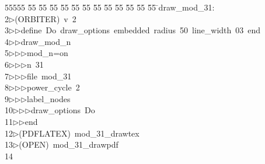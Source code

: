 %
%
\begin{tabbing}
55555 \= 55 \= 55 \= 55 \= 55 \= 55 \= 55 \= 55 \= 55 \= 55 \= 55 \= 55 \= 55 \= \>draw\_mod\_31:\\[0pt]
2\>$\triangleright$\>(ORBITER)\ v\ 2\ \\[0pt]
3\>$\triangleright$\>$\triangleright$\>define\ Do\ draw\_options\ embedded\ radius\ 50\ line\_width\ 03\ end\ \\[0pt]
4\>$\triangleright$\>$\triangleright$\>draw\_mod\_n\ \\[0pt]
5\>$\triangleright$\>$\triangleright$\>$\triangleright$\>mod\_n=on\ \\[0pt]
6\>$\triangleright$\>$\triangleright$\>$\triangleright$\>n\ 31\ \\[0pt]
7\>$\triangleright$\>$\triangleright$\>$\triangleright$\>file\ mod\_31\ \\[0pt]
8\>$\triangleright$\>$\triangleright$\>$\triangleright$\>power\_cycle\ 2\ \\[0pt]
9\>$\triangleright$\>$\triangleright$\>$\triangleright$\>label\_nodes\ \\[0pt]
10\>$\triangleright$\>$\triangleright$\>$\triangleright$\>draw\_options\ Do\ \\[0pt]
11\>$\triangleright$\>$\triangleright$\>end\\[0pt]
12\>$\triangleright$\>(PDFLATEX)\ mod\_31\_drawtex\\[0pt]
13\>$\triangleright$\>(OPEN)\ mod\_31\_drawpdf\\[0pt]
14\>\end{tabbing}
